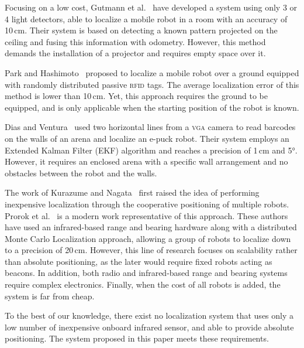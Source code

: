\documentclass{svmult}
\begin{document}
Focusing on a low cost, Gutmann et al.~\cite{gutmann2013challenges} have developed a system using only 3 or 4 light detectors, able to localize a mobile robot in a room with an accuracy of 10\,cm.
Their system is based on detecting a known pattern projected on the ceiling and fusing this information with odometry.
However, this method demands the installation of a projector and requires empty space over it.

Park and Hashimoto~\cite{park2009approach} proposed to localize a mobile robot over a ground equipped with randomly distributed passive \textsc{rfid} tags.
The average localization error of this method is lower than 10\,cm.
Yet, this approach requires the ground to be equipped, and is only applicable when the starting position of the robot is known.

Dias and Ventura~\cite{dias2013absolute} used two horizontal lines from a \textsc{vga} camera to read barcodes on the walls of an arena and localize an e-puck robot.
Their system employs an Extended Kalman Filter (EKF) algorithm and reaches a precision of 1\,cm and 5°.
However, it requires an enclosed arena with a specific wall arrangement and no obstacles between the robot and the walls.

The work of Kurazume and Nagata~\cite{kurazume1994cooperative} first raised the idea of performing inexpensive localization through the cooperative positioning of multiple robots.
Prorok et al.~\cite{prorok2012low} is a modern work representative of this approach.
These authors have used an infrared-based range and bearing hardware along with a distributed Monte Carlo Localization approach, allowing a group of robots to localize down to a precision of 20\,cm.
However, this line of research focuses on scalability rather than absolute positioning, as the later would require fixed robots acting as beacons.
In addition, both radio and infrared-based range and bearing systems require complex electronics.
Finally, when the cost of all robots is added, the system is far from cheap.

To the best of our knowledge, there exist no localization system that uses only a low number of inexpensive onboard infrared sensor, and able to provide absolute positioning.
The system proposed in this paper meets these requirements.
\end{document}

